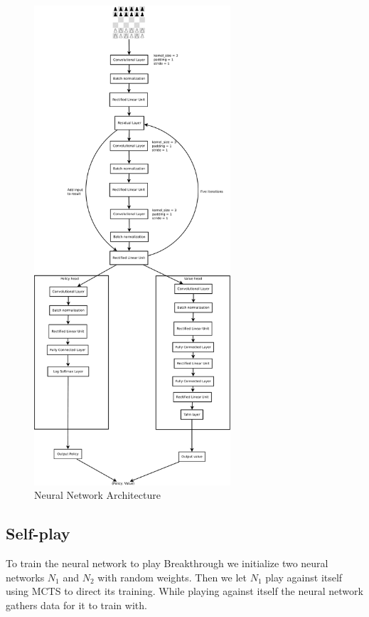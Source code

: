 \begin{figure}[]
    \centering

    \includegraphics[width=0.65\textwidth]{graphics/test}
    
    \caption{Neural Network Architecture}
    \label{fig:nnarch}
\end{figure}

\subsection{Self-play}

To train the neural network to play Breakthrough we initialize two neural networks $N_1$ and $N_2$ 
with random weights. Then we let $N_1$ play against itself using MCTS to direct its training. 
While playing against itself the neural network gathers data for it to train with. 

